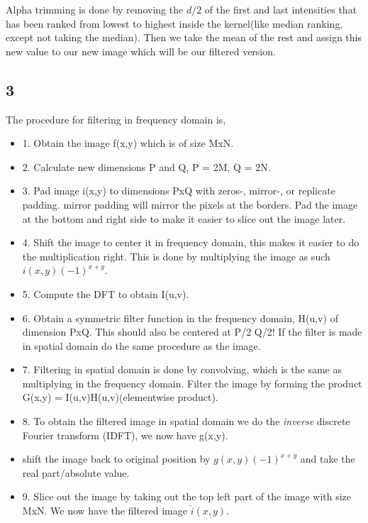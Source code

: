 {    Alpha trimming is done by removing the $d/2$ of the first and last intensities that has been ranked from lowest to highest inside the kernel(like median ranking, except not taking the median). Then we take the mean of the rest and assign this new value to our new image which will be our filtered version.

\subsection{3}

The procedure for filtering in frequency domain is,

\begin{itemize}
    \item 1. Obtain the image f(x,y) which is of size MxN.
    \item 2. Calculate new dimensions P and Q, P = 2M, Q = 2N.
    \item 3. Pad image i(x,y) to dimensions PxQ with zeros-, mirror-, or replicate padding. mirror padding will mirror the pixels at the borders. Pad the image at the bottom and right side to make it easier to slice out the image later.
    \item 4. Shift the image to center it in frequency domain, this makes it easier to do the multiplication right. This is done by multiplying the image as such $i(x,y)(-1)^{x+y}$.
    \item  5. Compute the DFT to obtain I(u,v).
    \item 6. Obtain a symmetric filter function in the frequency domain, H(u,v) of dimension PxQ. This should also be centered at P/2 Q/2! If the filter is made in spatial domain do the same procedure as the image.
    \item 7. Filtering in spatial domain is done by convolving, which is the same as multiplying in the frequency domain. Filter the image by forming the product G(x,y) = I(u,v)H(u,v)(elementwise product).
    \item 8. To obtain the filtered image in spatial domain we do the \emph{inverse} discrete Fourier transform (IDFT), we now have g(x,y).
    \item shift the image back to original position by $g(x,y)(-1)^{x+y}$ and take the real part/absolute value.
    \item 9. Slice out the image by taking out the top left part of the image with size MxN. We now have the filtered image $\hat{i}(x,y)$.
\end{itemize}

}
